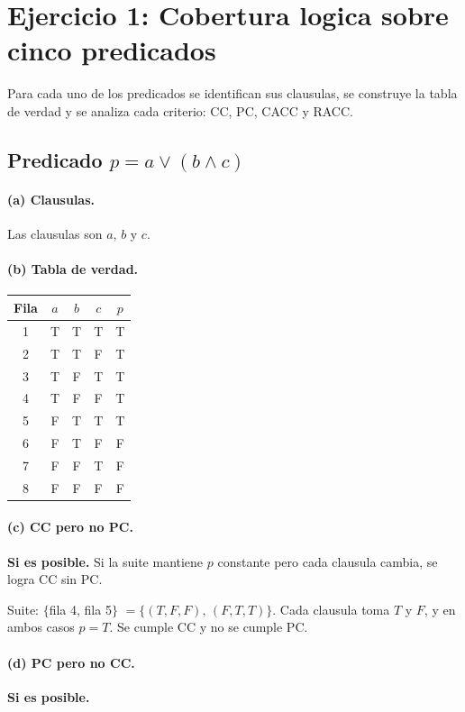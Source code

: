 \documentclass[12pt,a4paper]{article}
\begin{document}
\section{Ejercicio 1: Cobertura logica sobre cinco predicados}

Para cada uno de los predicados se identifican sus clausulas, se construye la tabla de verdad y
se analiza cada criterio: CC, PC, CACC y RACC.

\subsection{Predicado $p = a \vee (b \wedge c)$}

\paragraph{(a) Clausulas.} Las clausulas son $a$, $b$ y $c$.

\paragraph{(b) Tabla de verdad.}

\begin{center}
\begin{tabular}{ccccc}
\toprule
Fila & $a$ & $b$ & $c$ & $p$ \\
\midrule
1 & T & T & T & T \\
2 & T & T & F & T \\
3 & T & F & T & T \\
4 & T & F & F & T \\
5 & F & T & T & T \\
6 & F & T & F & F \\
7 & F & F & T & F \\
8 & F & F & F & F \\
\bottomrule
\end{tabular}
\end{center}

\paragraph{(c) CC pero no PC.} \textbf{Si es posible.} Si la suite mantiene $p$ constante pero
cada clausula cambia, se logra CC sin PC.

Suite: $\{$fila 4, fila 5$\}$ $=\{(T,F,F),\,(F,T,T)\}$. Cada clausula toma $T$ y $F$, y en ambos
casos $p = T$. Se cumple CC y no se cumple PC.

\paragraph{(d) PC pero no CC.} \textbf{Si es posible.}
\end{document}
